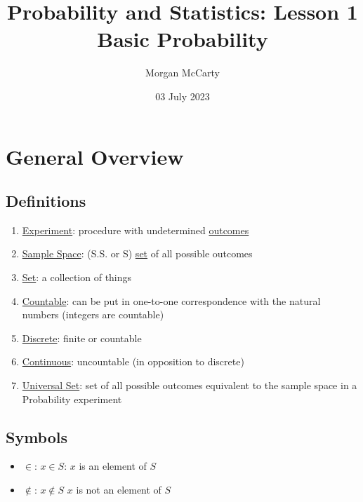 \documentclass[12pt]{article}
\title{
    Probability and Statistics: Lesson 1\\
    Basic Probability}
\author{Morgan McCarty}
\date{03 July 2023}
\begin{document}
    \maketitle

    \section{General Overview}
        \subsection{Definitions}
            \begin{enumerate}
                \item \underline{Experiment}: procedure with undetermined \underline{outcomes}
                \item \underline{Sample Space}: (S.S. or S) \underline{set} of all possible outcomes
                \item \underline{Set}: a collection of things
                \item \underline{Countable}: can be put in one-to-one correspondence with the natural numbers (integers are countable)
                \item \underline{Discrete}: finite or countable
                \item \underline{Continuous}: uncountable (in opposition to discrete)
                \item \underline{Universal Set}: set of all possible outcomes equivalent to the sample space in a Probability experiment
            \end{enumerate}

        \subsection{Symbols}
            \begin{itemize}
                \item $\in$: $x \in S$: $x$ is an element of $S$
                \item $\notin$: $x \notin S$ $x$ is not an element of $S$
            \end{itemize}
        
\end{document}
